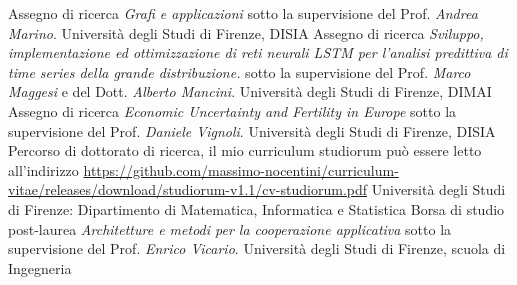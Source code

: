 \documentclass[totpages,openbib,italian]{europecv}
\begin{document}
\begin{europecv}

{Assegno di ricerca \emph{Grafi e applicazioni} sotto la supervisione del Prof. \emph{Andrea Marino}.}
 {Universit\`a degli Studi di Firenze, DISIA}
{Assegno di ricerca \emph{Sviluppo, implementazione ed ottimizzazione di reti neurali LSTM per l’analisi predittiva di time series della grande distribuzione.} sotto la supervisione del
Prof. \emph{Marco Maggesi} e del Dott. \emph{Alberto Mancini}.}
 {Universit\`a degli Studi di Firenze, DIMAI} 
{Assegno di ricerca \emph{Economic Uncertainty and Fertility in Europe} sotto la supervisione del
 Prof. \emph{Daniele Vignoli}.}
 {Universit\`a degli Studi di Firenze, DISIA} 
{Percorso di dottorato di ricerca, il mio curriculum studiorum pu\`o essere letto all'indirizzo
\url{https://github.com/massimo-nocentini/curriculum-vitae/releases/download/studiorum-v1.1/cv-studiorum.pdf}}
{Universit\`a degli Studi di Firenze: Dipartimento di Matematica, Informatica e Statistica} 
{Borsa di studio post-laurea \emph{Architetture e metodi
 per la cooperazione applicativa} sotto la supervisione del Prof. \emph{Enrico Vicario}.}
{Universit\`a degli Studi di Firenze, scuola di Ingegneria}



\end{europecv}
\end{document}
